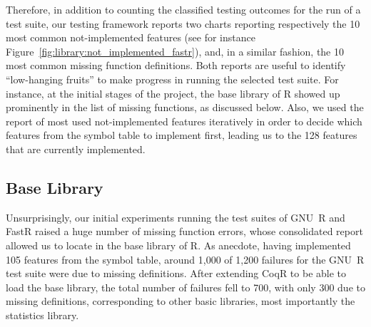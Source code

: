 \documentclass[
    sigplan,
    10pt,
    review, %
    natbib=false %
 ]{acmart}
\newcommand\et[1]{\todo[color=blue!20,size=\scriptsize]{#1}}
\newcommand\td[1]{\todo[color=green!20,size=\scriptsize]{#1}}
\newcommand\CoqR{CoqR}
\begin{document}
Therefore, in addition to counting the classified testing outcomes for the run of a test suite, our testing framework reports two charts reporting respectively the 10 most common not-implemented features (see for instance Figure~\ref{fig:library:not_implemented_fastr}), and, in a similar fashion, the 10 most common missing function definitions. Both reports are useful to identify ``low-hanging fruits'' to make progress in running the selected test suite. For instance, at the initial stages of the project, the base library of R showed up prominently in the list of missing functions, as discussed below.
Also, we used the report of most used not-implemented features iteratively in order to decide which features from the symbol table to implement first, leading us to the 128 features that are currently implemented.
%





\subsection{Base Library}
\label{sec:library}





Unsurprisingly, our initial experiments running the test suites of GNU~R and FastR raised a huge number of missing function errors, whose consolidated report allowed us to locate in the base library of R. As anecdote, having implemented 105 features from the symbol table, around 1,000 of 1,200 failures
for the GNU~R test suite were due to missing definitions.
After extending \CoqR{} to be able to load the base library, the total number of failures fell to 700, with only 300 due to missing definitions, corresponding to other basic libraries, most importantly the statistics library.
\end{document}
